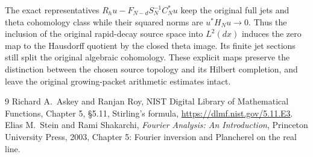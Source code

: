 \documentclass[11pt]{article}
\begin{document}
The exact representatives
$R_hu-F_{N-d}S_N^{-1}C_N^*u$ keep the original full jets and theta
cohomology class while their squared norms are $u^*H_Nu\to0$.
Thus the inclusion of the original rapid-decay source space into
$L^2(dx)$ induces the zero map to the Hausdorff quotient by the
closed theta image. Its finite jet sections still split the original
algebraic cohomology. These explicit maps preserve the distinction
between the chosen source topology and its Hilbert completion, and
leave the original growing-packet arithmetic estimates intact.

\begin{thebibliography}{9}
 Richard A.~Askey and Ranjan Roy,
NIST Digital Library of Mathematical Functions,
Chapter 5, \S5.11, Stirling's formula,
\url{https://dlmf.nist.gov/5.11.E3}.
 Elias M.~Stein and Rami Shakarchi,
\emph{Fourier Analysis: An Introduction}, Princeton University Press,
2003, Chapter 5: Fourier inversion and Plancherel on the real line.
\end{thebibliography}
\end{document}
